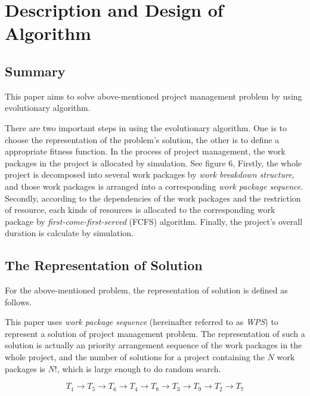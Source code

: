 %
%

\section{Description and Design of Algorithm}

\subsection{Summary}
%
This paper aims to solve above-mentioned project management problem by using
evolutionary algorithm.


There are two important steps in using the evolutionary algorithm. One is to
choose the representation of the problem's solution, the other is to define a
appropriate fitness function. In the process of project management, the work
packages in the project is allocated by simulation. See figure 6, Firstly, the
whole project is decomposed into several work packages by \emph{work breakdown
  structure}, and those work packages is arranged into a corresponding
\emph{work package sequence}. Secondly, according to the dependencies of the
work packages and the restriction of resource, each kinds of resources is
allocated to the corresponding work package by \emph{first-come-first-served}
(FCFS) algorithm. Finally, the project's overall duration is calculate by
simulation.


\subsection{The Representation of Solution}
%
For the above-mentioned problem, the representation of solution is defined as
follows.


This paper uses \emph{work package sequence} (hereinafter referred to as \emph{WPS}) to
represent a solution of project management problem. The representation of such a
solution is actually an priority arrangement sequence of the work packages in
the whole project, and the number of solutions for a project containing the $N$
work packages is $N!$, which is large enough to do random search.

\begin{equation}
  T_1 \rightarrow T_5 \rightarrow T_6 \rightarrow T_4 \rightarrow T_8
  \rightarrow T_3 \rightarrow T_9 \rightarrow T_2 \rightarrow T_7
  \label{repr}
\end{equation}

